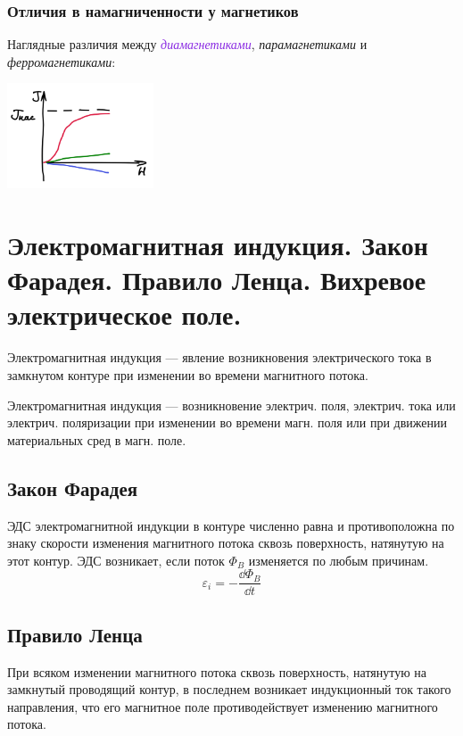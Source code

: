 \documentclass[12pt]{report}
\begin{document}
\subsubsection*{Отличия в намагниченности у магнетиков}
Наглядные различия между \textit{\textcolor{BlueViolet}{диамагнетиками}},
\textit{\textcolor{OliveGreen}{парамагнетиками}} и
\textit{\textcolor{BrickRed}{ферромагнетиками}}:
\begin{center}
    \includegraphics[width=0.325\textwidth]{graphics/22_3.png}
\end{center}

\setcounter{section}{22}

\section{Электромагнитная индукция. Закон Фарадея. Правило Ленца. Вихревое электрическое поле.}
Электромагнитная индукция --- явление возникновения электрического тока в замкнутом контуре при изменении во времени магнитного потока.

Электромагнитная индукция --- возникновение электрич. поля, электрич. тока или электрич. поляризации при изменении во времени магн. поля или при движении материальных сред в магн. поле.

\subsection{Закон Фарадея}
ЭДС электромагнитной индукции в контуре численно равна и противоположна по знаку скорости изменения магнитного потока сквозь поверхность, натянутую на этот контур. ЭДС возникает, если поток $\Phi_B$ изменяется по любым причинам.
\[
    \varepsilon_i = - \dfrac{\dd{\Phi_B}}{\dd t}
\]

\subsection{Правило Ленца}
При всяком изменении магнитного потока сквозь поверхность, натянутую на замкнутый проводящий контур, в последнем возникает индукционный ток такого направления, что его магнитное поле противодействует изменению магнитного потока.
\end{document}
